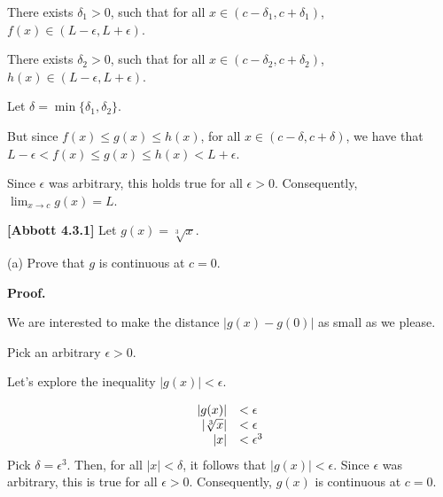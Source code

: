 \documentclass[10pt]{article}
\begin{document}
There exists $\displaystyle \delta _{1}  >0$, such that for all $\displaystyle x\in ( c-\delta _{1} ,c+\delta _{1})$, $\displaystyle f( x) \in ( L-\epsilon ,L+\epsilon )$. 



There exists $\displaystyle \delta _{2}  >0$, such that for all $\displaystyle x\in ( c-\delta _{2} ,c+\delta _{2})$, $\displaystyle h( x) \in ( L-\epsilon ,L+\epsilon )$. 



Let $\displaystyle \delta =\min\{\delta _{1} ,\delta _{2}\}$. 



But since $\displaystyle f( x) \leq g( x) \leq h( x)$, for all $\displaystyle x\in ( c-\delta ,c+\delta )$, we have that $\displaystyle L-\epsilon < f( x) \leq g( x) \leq h( x) < L+\epsilon $. 



Since $\displaystyle \epsilon $ was arbitrary, this holds true for all $\displaystyle \epsilon  >0$. Consequently, $\displaystyle \lim _{x\rightarrow c} g( x) =L$.

\textbf{[Abbott 4.3.1]} Let $\displaystyle g( x) =\sqrt[3] x$.



(a) Prove that $\displaystyle g$ is continuous at $\displaystyle c=0$.



\textbf{Proof.}



We are interested to make the distance $\displaystyle |g( x) -g( 0) |$ as small as we please.



Pick an arbitrary $\displaystyle \epsilon  >0$.



Let's explore the inequality $\displaystyle |g( x) |< \epsilon $. 




\begin{equation*}
\begin{array}{ r l }
|g( x) | & < \epsilon \\
|\sqrt[3] x| & < \epsilon \\
|x| & < \epsilon ^{3}
\end{array}
\end{equation*}
 Pick $\displaystyle \delta =\epsilon ^{3}$. Then, for all $\displaystyle |x|< \delta $, it follows that $\displaystyle |g( x) |< \epsilon $. Since $\displaystyle \epsilon $ was arbitrary, this is true for all $\displaystyle \epsilon  >0$. Consequently, $\displaystyle g( x)$ is continuous at $\displaystyle c=0$.
\end{document}
